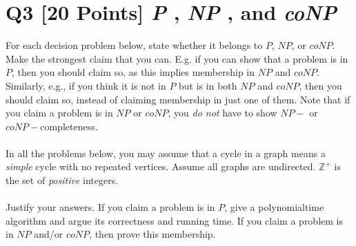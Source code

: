 \documentclass[10pt]{article}
\begin{document}
\section*{Q3 [20 Points] \textit{P} , \textit{NP} , and \textit{coNP}}
For each decision problem below, state whether it belongs to $P$, $NP$, or $coNP$. Make the strongest claim that you can. E.g. if you can show that a problem is in $P$, then you should claim so, as this implies membership in $NP$ and $coNP$. Similarly, e.g., if you think it is not in $P$ but is in both $NP$ and $coNP$, then you should claim so, instead of claiming membership in just one of them. Note that if you claim a problem is in $NP$ or $coNP$, you \textit{do not} have to show $NP-$ or $coNP-$completeness.\\
\\
In all the problems below, you may assume that a cycle in a graph means a \textit{simple} cycle with no repeated vertices. Assume all graphs are undirected. $\mathbb{Z}^+$ is the set of \textit{positive} integers.\\
\\
Justify your answers. If you claim a problem is in $P$, give a polynomial\-time algorithm and argue its correctness and running time. If you claim a problem is in $NP$ and/or $coNP$, then prove this membership.
\end{document}
